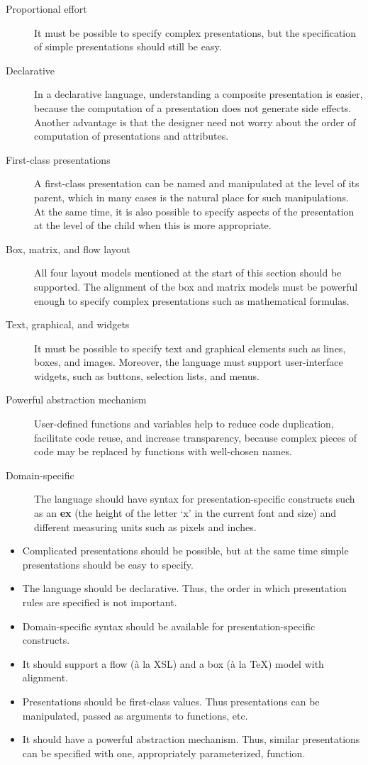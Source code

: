 \begin{description}
\item[Proportional effort]
It must be possible to specify complex presentations, but the specification of simple presentations should still be easy.
\item[Declarative]
In a declarative language, understanding a composite presentation is easier, because the computation of a presentation does not generate side effects. Another advantage is that the designer need not worry about the order of computation of presentations and attributes.
\item[First-class presentations]
A first-class presentation can be named and manipulated at the level of its parent, which in many cases is the natural place for such manipulations. At the same time, it is also possible to specify aspects of the presentation at the level of the child when this is more appropriate.
\item[Box, matrix, and flow layout]
All four layout models mentioned at the start of this section should be supported. The alignment of the box and matrix models must be powerful enough to specify complex presentations such as mathematical formulas. 
\item[Text, graphical, and widgets]
It must be possible to specify text and graphical elements such as lines, boxes, and images. Moreover, the language must support user-interface widgets, such as buttons, selection lists, and menus. 
\item[Powerful abstraction mechanism]
User-defined functions and variables help to reduce code duplication, facilitate code reuse, and increase transparency, because complex pieces of code may be replaced by functions with well-chosen names.
\item[Domain-specific]
The language should have syntax for presentation-specific constructs such as an {\bf ex} (the height of the letter `x' in the current font and size) and different measuring units such as pixels and inches.
\end{description}
\bc
\begin{itemize}
\item Complicated presentations should be possible, but at the same time simple presentations should be easy to specify.
\item The language should be declarative. Thus, the order in which presentation rules are specified is not important.
\item Domain-specific syntax should be available for presentation-specific constructs. 
\item It should support a flow (\`a la XSL) and a box (\`a la \TeX) model with alignment.
\item Presentations should be first-class values. Thus presentations can be manipulated, passed as arguments to functions, etc.
\item It should have a powerful abstraction mechanism. Thus, similar presentations can be specified with one, appropriately parameterized, function.
\end{itemize}
\ec



